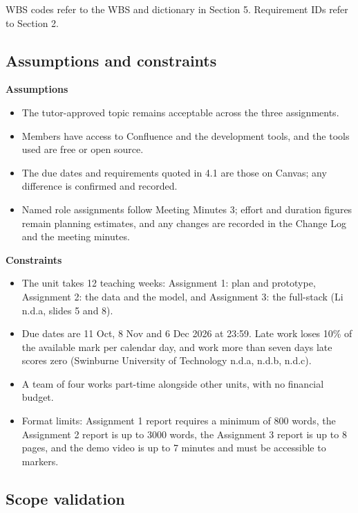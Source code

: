 WBS codes refer to the WBS and dictionary in Section 5. Requirement IDs refer to Section 2.

\subsection{Assumptions and constraints}
\label{sec:assumptions}

\textbf{Assumptions}

\begin{itemize}
  \item The tutor-approved topic remains acceptable across the three assignments.
  \item Members have access to Confluence and the development tools, and the tools used are free or open source.
  \item The due dates and requirements quoted in 4.1 are those on Canvas; any difference is confirmed and recorded.
  \item Named role assignments follow Meeting Minutes 3; effort and duration figures remain planning estimates, and any changes are recorded in the Change Log and the meeting minutes.
\end{itemize}

\textbf{Constraints}

\begin{itemize}
  \item The unit takes 12 teaching weeks: Assignment 1: plan and prototype, Assignment 2: the data and the model, and Assignment 3: the full-stack (Li n.d.a, slides 5 and 8).
  \item Due dates are 11 Oct, 8 Nov and 6 Dec 2026 at 23:59. Late work loses 10\% of the available mark per calendar day, and work more than seven days late scores zero (Swinburne University of Technology n.d.a, n.d.b, n.d.c).
  \item A team of four works part-time alongside other units, with no financial budget.
  \item Format limits: Assignment 1 report requires a minimum of 800 words, the Assignment 2 report is up to 3000 words, the Assignment 3 report is up to 8 pages, and the demo video is up to 7 minutes and must be accessible to markers.
\end{itemize}

\subsection{Scope validation}
\label{sec:validation}

